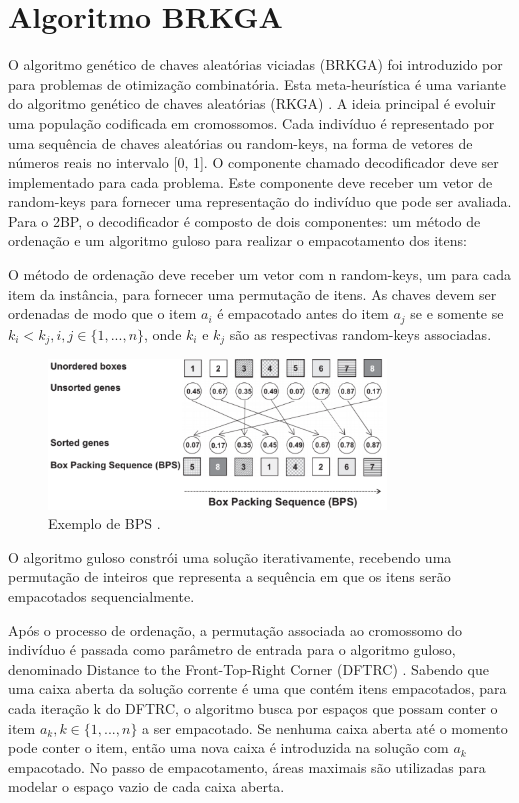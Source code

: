 \documentclass[article]{rian_article}
\begin{document}
\section{Algoritmo BRKGA}\label{sec:corte}
O algoritmo genético de chaves aleatórias viciadas (BRKGA) foi introduzido por \citet{resende2011} para problemas de otimização combinatória. Esta meta-heurística é uma variante do algoritmo genético de chaves aleatórias (RKGA) \citep{bean1994}. 
A ideia principal é evoluir uma população codificada em cromossomos. Cada indivíduo é representado por uma sequência de chaves aleatórias ou random-keys, na forma de vetores de números reais no intervalo [0, 1].
O componente chamado decodificador deve ser implementado para cada problema. Este componente deve receber um vetor de random-keys para fornecer uma representação do indivíduo que pode ser avaliada. Para o 2BP, o decodificador é composto de dois componentes: um método de ordenação e um algoritmo guloso para realizar o empacotamento dos itens:

O método de ordenação deve receber um vetor com n random-keys, um para cada item da instância, para fornecer uma permutação de itens. As chaves devem ser ordenadas de modo que o item $a_{i}$ é empacotado antes do item $a_{j}$ se e somente se $k_{i} < k_{j}, {i}, {j} \in \{1, ..., {n}\}$, onde $k_{i}$ e $k_{j}$ são as respectivas random-keys associadas.

\begin{figure}[hbt]
	\centering
	\includegraphics[width=0.8\textwidth]{figs/random_keys.png}
	\caption{Exemplo de BPS \citep{resende2013}.} \label{fig:rand_keys}
\end{figure}

O algoritmo guloso constrói uma solução iterativamente, recebendo uma permutação de inteiros que representa a sequência em que os itens serão empacotados sequencialmente.

Após o processo de ordenação, a permutação associada ao cromossomo do indivíduo é passada como parâmetro de entrada para o algoritmo guloso, denominado Distance to the Front-Top-Right Corner (DFTRC) \citep{resende2013}. Sabendo que uma caixa aberta da solução corrente é uma que contém itens empacotados, para cada iteração {k} do DFTRC, o algoritmo busca por espaços que possam conter o item  $a_{k}, {k} \in \{1, ..., {n}\}$ a ser empacotado. Se nenhuma caixa aberta até o momento pode conter o item, então uma nova caixa é introduzida na solução com $a_{k}$ empacotado. No passo de empacotamento, áreas maximais são utilizadas para modelar o espaço vazio de cada caixa aberta.
\end{document}
